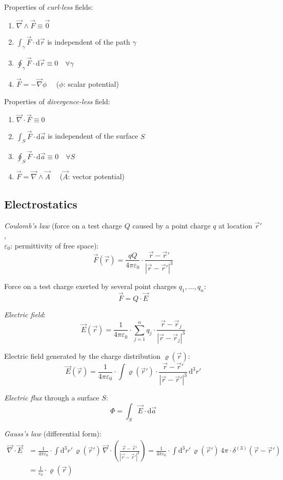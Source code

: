 \documentclass[fontsize=11pt,a4paper]{scrartcl}
\begin{document}
Properties of \emph{curl-less} fields:
\begin{enumerate}
	\item $\vec\nabla\wedge\vec F\equiv\vec 0$
	\item $\int_\gamma\vec F\cdot\mathrm{d}\vec r$ is independent of the path $\gamma$
	\item $\oint_\gamma\vec F\cdot\mathrm{d}\vec r\equiv 0\quad\forall\gamma$
	\item $\vec F=-\vec\nabla \phi\quad$ ($\phi$: scalar potential)
\end{enumerate}

Properties of \emph{divergence-less} field:
\begin{enumerate}
	\item $\vec\nabla\cdot\vec F\equiv 0$
	\item $\int_S\vec F\cdot\mathrm{d}\vec a$ is independent of the surface $S$
	\item $\oint_S\vec F\cdot\mathrm{d}\vec a\equiv 0\quad\forall S$
	\item $\vec F=\vec\nabla\wedge\vec A\quad$ ($\vec A$: vector potential)
\end{enumerate}
%
%
%
%
\subsection{Electrostatics}
\emph{Coulomb's law} (force on a test charge $Q$ caused by a point charge $q$ at location $\vec r'$,\\ $\varepsilon_0$: permittivity of free space):
\[
	\vec F(\vec r) = \frac{qQ}{4\pi\varepsilon_0}\cdot\frac{\vec r-\vec r'}{|\vec r-\vec r'|^3}
\]

Force on a test charge exerted by several point charges $q_1,\dots,q_n$:
\[
	\vec F = Q\cdot\vec E
\]

\emph{Electric field}:
\[
	\vec E(\vec r) = \frac{1}{4\pi\varepsilon_0}\cdot\sum_{j=1}^n q_j\cdot\frac{\vec r-\vec r_j}{|\vec r-\vec r_j|^3}
\]

Electric field generated by the charge distribution $\varrho(\vec r)$:
\[
	\vec E(\vec r) = \frac{1}{4\pi\varepsilon_0}\cdot\int\varrho(\vec r')\cdot\frac{\vec r-\vec r'}{|\vec r-\vec r'|^3}\,\mathrm{d}^3 r'
\]

\emph{Electric flux} through a surface $S$:
\[
	\Phi = \int_S\vec E\cdot\mathrm{d}\vec a
\]

\emph{Gauss's law} (differential form):
\begin{equation*}
\begin{split}
	\vec\nabla\cdot\vec E &= \frac{1}{4\pi\varepsilon_0}\cdot\int\mathrm{d}^3 r'\,\varrho(\vec r')\,\vec\nabla\cdot\left(\frac{\vec r-\vec r'}{|\vec r-\vec r'|^3}\right)
	                         = \frac{1}{4\pi\varepsilon_0}\cdot\int\mathrm{d}^3 r'\,\varrho(\vec r')\,4\pi\cdot\delta^{(3)}(\vec r-\vec r')\\
	                      &= \frac{1}{\varepsilon_0}\cdot\varrho(\vec r)
\end{split}
\end{equation*}
\end{document}
